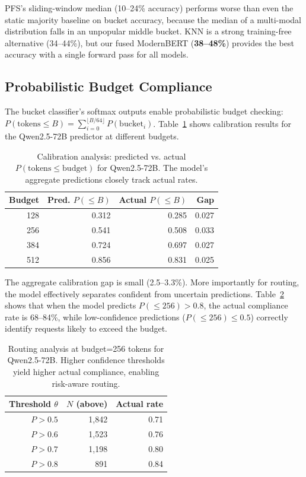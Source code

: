 \documentclass[letterpaper, anonymous, twocolumn, 10pt]{article}
\begin{document}
PFS's sliding-window median (10--24\% accuracy) performs worse than even the static majority baseline on bucket accuracy, because the median of a multi-modal distribution falls in an unpopular middle bucket. KNN is a strong training-free alternative (34--44\%), but our fused ModernBERT (\textbf{38--48\%}) provides the best accuracy with a single forward pass for all models.

\subsection{Probabilistic Budget Compliance} \label{section:calibration}

The bucket classifier's softmax outputs enable probabilistic budget checking: $P(\text{tokens} \leq B) = \sum_{i=0}^{\lfloor B/64 \rfloor} P(\text{bucket}_i)$.
Table~\ref{tab:calibration} shows calibration results for the Qwen2.5-72B predictor at different budgets.

\begin{table}[t]
\centering
\small
\caption{Calibration analysis: predicted vs. actual $P(\text{tokens} \leq \text{budget})$ for Qwen2.5-72B. The model's aggregate predictions closely track actual rates.}
\label{tab:calibration}
\begin{tabular}{rrrr}
\hline
Budget & Pred. $P(\leq B)$ & Actual $P(\leq B)$ & Gap \\
\hline
128 & 0.312 & 0.285 & 0.027 \\
256 & 0.541 & 0.508 & 0.033 \\
384 & 0.724 & 0.697 & 0.027 \\
512 & 0.856 & 0.831 & 0.025 \\
\hline
\end{tabular}
\end{table}

The aggregate calibration gap is small (2.5--3.3\%).
More importantly for routing, the model effectively separates confident from uncertain predictions.
Table~\ref{tab:routing_analysis} shows that when the model predicts $P(\leq 256) > 0.8$, the actual compliance rate is 68--84\%, while low-confidence predictions ($P(\leq 256) \leq 0.5$) correctly identify requests likely to exceed the budget.

\begin{table}[t]
\centering
\small
\caption{Routing analysis at budget=256 tokens for Qwen2.5-72B. Higher confidence thresholds yield higher actual compliance, enabling risk-aware routing.}
\label{tab:routing_analysis}
\begin{tabular}{rrr}
\hline
Threshold $\theta$ & $N$ (above) & Actual rate \\
\hline
$P > 0.5$ & 1,842 & 0.71 \\
$P > 0.6$ & 1,523 & 0.76 \\
$P > 0.7$ & 1,198 & 0.80 \\
$P > 0.8$ & 891 & 0.84 \\
\hline
\end{tabular}
\end{table}
\end{document}
